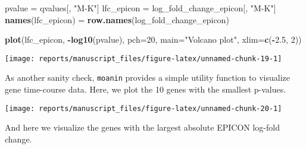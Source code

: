 \documentclass[9pt,a4paper,]{extarticle}
\newenvironment{Shaded}{\begin{snugshade}}{\end{snugshade}}
\newcommand{\DataTypeTok}[1]{\textcolor[rgb]{0.13,0.29,0.53}{#1}}
\newcommand{\DecValTok}[1]{\textcolor[rgb]{0.00,0.00,0.81}{#1}}
\newcommand{\FloatTok}[1]{\textcolor[rgb]{0.00,0.00,0.81}{#1}}
\newcommand{\KeywordTok}[1]{\textcolor[rgb]{0.13,0.29,0.53}{\textbf{#1}}}
\newcommand{\NormalTok}[1]{#1}
\newcommand{\OperatorTok}[1]{\textcolor[rgb]{0.81,0.36,0.00}{\textbf{#1}}}
\newcommand{\OtherTok}[1]{\textcolor[rgb]{0.56,0.35,0.01}{#1}}
\newcommand{\StringTok}[1]{\textcolor[rgb]{0.31,0.60,0.02}{#1}}
\begin{document}
\begin{Shaded}
\begin{Highlighting}[]
\NormalTok{pvalue =}\StringTok{ }\NormalTok{qvalues[, }\StringTok{"M-K"}\NormalTok{]}
\NormalTok{lfc_epicon =}\StringTok{ }\NormalTok{log_fold_change_epicon[, }\StringTok{"M-K"}\NormalTok{]}
\KeywordTok{names}\NormalTok{(lfc_epicon) =}\StringTok{ }\KeywordTok{row.names}\NormalTok{(log_fold_change_epicon)}

\KeywordTok{plot}\NormalTok{(lfc_epicon, }\OperatorTok{-}\KeywordTok{log10}\NormalTok{(pvalue), }\DataTypeTok{pch=}\DecValTok{20}\NormalTok{, }\DataTypeTok{main=}\StringTok{"Volcano plot"}\NormalTok{,}
     \DataTypeTok{xlim=}\KeywordTok{c}\NormalTok{(}\OperatorTok{-}\FloatTok{2.5}\NormalTok{, }\DecValTok{2}\NormalTok{))}
\end{Highlighting}
\end{Shaded}

\begin{center}\texttt{[image: reports/manuscript\_files/figure-latex/unnamed-chunk-19-1]} \end{center}

As another sanity check, \texttt{moanin} provides a simple utility function to
visualize gene time-course data. Here, we plot the 10 genes with the smallest
p-values.

\begin{Shaded}
\end{Shaded}

\begin{center}\texttt{[image: reports/manuscript\_files/figure-latex/unnamed-chunk-20-1]} \end{center}

And here we visualize the genes with the largest absolute EPICON log-fold
change.
\end{document}
